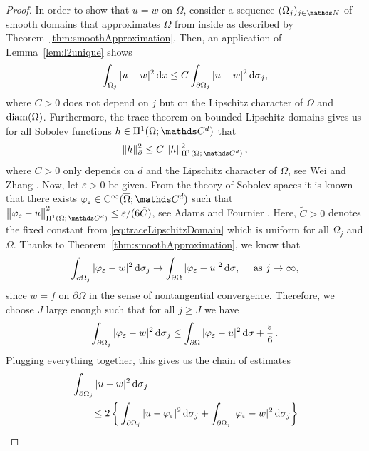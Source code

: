 \begin{proof}
  In order to show that $u = w$ on $\Omega$, consider a sequence $(\Omega_j)_{j \in \N}$ of smooth domains that approximates $\Omega$ from inside as described by Theorem~\ref{thm:smoothApproximation}.
  Then, an application of Lemma~\ref{lem:l2unique} shows
  \begin{align}
    \label{eq:reverseTraceUnique}
    \int_{\Omega_j} |u - w|^2 \, {\operatorname{d}\!{x}} \leq C \int_{\partial\Omega_j} |u - w|^2 \, {\operatorname{d}\!{\sigma}}_j,
  \end{align}
  where $C> 0$ does not depend on $j$ but on the Lipschitz character of $\Omega$ and $\operatorname{diam}(\Omega)$.
  Furthermore, the trace theorem on bounded Lipschitz domains gives us for all Sobolev functions $h \in \HH^1(\Omega; \C^d)$ that
  \begin{align}
    \label{eq:traceLipschitzDomain}
     \|h\|_\partial^2 \leq C\, \|h\|_{\HH^1(\Omega; \,\C^d)}^2\,,
  \end{align}
  where $C> 0$ only depends on $d$ and the Lipschitz character of $\Omega$, see Wei and Zhang \cite[Lem.\@~2.2]{weiZhang}.
  Now, let $\varepsilon > 0$ be given. 
  From the theory of Sobolev spaces it is known that there exists $\varphi_\varepsilon \in \CC^\infty(\overline\Omega; \C^d)$ such that $\big\|\varphi_\varepsilon - u\big\|_{\HH^1(\Omega;\, \C^d)}^2 \leq {\varepsilon}/({6 \tilde C})$, see Adams and Fournier \cite[Thm.\@~3.18]{adams}.
  Here, $\tilde C > 0$ denotes the fixed constant from \eqref{eq:traceLipschitzDomain} which is uniform for all $\Omega_j$ and $\Omega$.
  Thanks to Theorem~\ref{thm:smoothApproximation}, we know that 
  \begin{align*}
    \int_{\partial\Omega_j} |\varphi_\varepsilon - w|^2 \, {\operatorname{d}\!{\sigma}}_j \to \int_{\partial\Omega} |\varphi_\varepsilon - u|^2 \, {\operatorname{d}\!{\sigma}}, \quad \text{ as } j \to \infty,
  \end{align*}
  since $w = f$ on $\partial\Omega$ in the sense of nontangential convergence.
  Therefore, we choose $J$ large enough such that for all $j \geq J$ we have
  \begin{align*}
    \int_{\partial\Omega_j} |\varphi_\varepsilon - w|^2 \, {\operatorname{d}\!{\sigma}}_j \leq \int_{\partial\Omega} |\varphi_\varepsilon - u|^2 \, {\operatorname{d}\!{\sigma}} + \frac{\varepsilon}{6}\,.
  \end{align*}
  Plugging everything together, this gives us the chain of estimates
  \begin{align*}
    &\int_{\partial\Omega_j} |u - w|^2 \d\sigma_j  \\
    &\qquad\leq 2 \, \bigg\{ \int_{\partial\Omega_j} |u - \varphi_\varepsilon |^2 \d\sigma_j + \int_{\partial\Omega_j} |\varphi_\varepsilon - w|^2 \d\sigma_j \bigg\}

\end{align*}
\end{proof}
